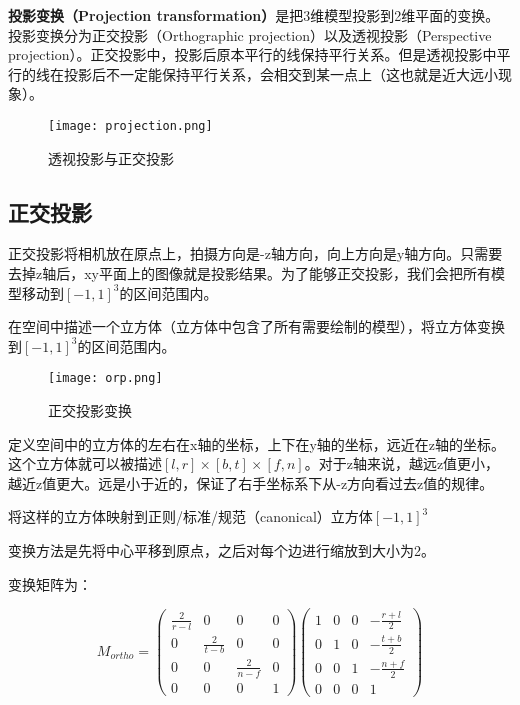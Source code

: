 \documentclass[openany]{progbookcn}
\begin{document}
\textbf{投影变换（Projection transformation）}是把3维模型投影到2维平面的变换。投影变换分为正交投影（Orthographic projection）以及透视投影（Perspective projection）。正交投影中，投影后原本平行的线保持平行关系。但是透视投影中平行的线在投影后不一定能保持平行关系，会相交到某一点上（这也就是近大远小现象）。

\begin{figure}[H]
	\centering
	\texttt{[image: projection.png]}
	\caption{透视投影与正交投影}
	\label{fig:projection}
\end{figure}

\subsection{正交投影}

正交投影将相机放在原点上，拍摄方向是-z轴方向，向上方向是y轴方向。只需要去掉z轴后，xy平面上的图像就是投影结果。为了能够正交投影，我们会把所有模型移动到$[-1,1]^3$的区间范围内。

在空间中描述一个立方体（立方体中包含了所有需要绘制的模型），将立方体变换到$[-1,1]^3$的区间范围内。

\begin{figure}[H]
	\centering
	\texttt{[image: orp.png]}
	\caption{正交投影变换}
	\label{fig:projection}
\end{figure}

定义空间中的立方体的左右在x轴的坐标，上下在y轴的坐标，远近在z轴的坐标。这个立方体就可以被描述$[l,r]\times[b,t]\times[f,n]$。对于z轴来说，越远z值更小，越近z值更大。远是小于近的，保证了右手坐标系下从-z方向看过去z值的规律。

将这样的立方体映射到正则/标准/规范（canonical）立方体$[-1,1]^3$

变换方法是先将中心平移到原点，之后对每个边进行缩放到大小为2。

变换矩阵为：

\begin{equation}
	M_{ortho}=\begin{pmatrix}\frac{2}{r-l}&0&0&0\\0&\frac{2}{t-b}&0&0\\0&0&\frac{2}{n-f}&0\\0&0&0&1\end{pmatrix}\begin{pmatrix}1&0&0&-\frac{r+l}{2}\\0&1&0&-\frac{t+b}{2}\\0&0&1&-\frac{n+f}{2}\\0&0&0&1\end{pmatrix}
\end{equation}
\end{document}
